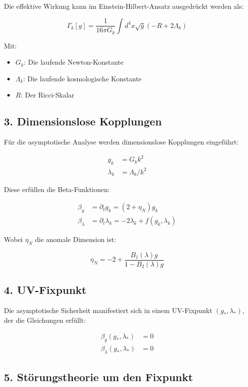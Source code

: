 \documentclass{article}
\begin{document}
Die effektive Wirkung kann im Einstein-Hilbert-Ansatz ausgedrückt werden als:

\[
\Gamma_k[g] = \frac{1}{16\pi G_k} \int d^4x \sqrt{g} \left(-R + 2\Lambda_k\right)
\]

Mit:

\begin{itemize}
	\item $G_k$: Die laufende Newton-Konstante
	\item $\Lambda_k$: Die laufende kosmologische Konstante
	\item $R$: Der Ricci-Skalar
\end{itemize}

\subsection{3. Dimensionslose Kopplungen}

Für die asymptotische Analyse werden dimensionslose Kopplungen eingeführt:

\begin{align*}
	g_k &= G_k k^2 \\
	\lambda_k &= \Lambda_k/k^2
\end{align*}

Diese erfüllen die Beta-Funktionen:

\begin{align*}
	\beta_g &= \partial_t g_k = (2 + \eta_N)g_k \\
	\beta_\lambda &= \partial_t \lambda_k = -2\lambda_k + f(g_k,\lambda_k)
\end{align*}

Wobei $\eta_N$ die anomale Dimension ist:

\[
\eta_N = -2 + \frac{B_1(\lambda)g}{1 - B_2(\lambda)g}
\]

\subsection{4. UV-Fixpunkt}

Die asymptotische Sicherheit manifestiert sich in einem UV-Fixpunkt $(g_*,\lambda_*)$, der die Gleichungen erfüllt:

\begin{align*}
	\beta_g(g_*,\lambda_*) &= 0 \\
	\beta_\lambda(g_*,\lambda_*) &= 0
\end{align*}

\subsection{5. Störungstheorie um den Fixpunkt}
\end{document}
